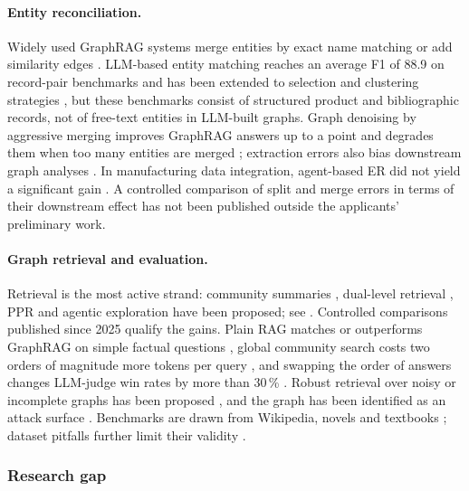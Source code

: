 \paragraph{Entity reconciliation.}
Widely used \ac{GraphRAG} systems merge entities by exact name matching \parencite{edge2024local,guo2025lightrag} or add similarity edges \parencite{gutierrez2024hipporag,gutierrez2025rag}. \ac{LLM}-based entity matching reaches an average F1 of 88.9 on record-pair benchmarks \parencite{peeters2023entity} and has been extended to selection and clustering strategies \parencite{wang2024match,fu2025incontext}, but these benchmarks consist of structured product and bibliographic records, not of free-text entities in \ac{LLM}-built graphs. Graph denoising by aggressive merging improves \ac{GraphRAG} answers up to a point and degrades them when too many entities are merged \parencite{zheng2025less}; extraction errors also bias downstream graph analyses \parencite{cai2025understanding}. In manufacturing data integration, agent-based \ac{ER} did not yield a significant gain \parencite{bega2025mixture}. A controlled comparison of split and merge errors in terms of their downstream effect has not been published outside the applicants' preliminary work.

\paragraph{Graph retrieval and evaluation.}
Retrieval is the most active strand: community summaries \parencite{edge2024local}, dual-level retrieval \parencite{guo2025lightrag}, \ac{PPR} \parencite{gutierrez2024hipporag,gutierrez2025rag} and agentic exploration have been proposed; see \parencite{peng2026survey}. Controlled comparisons published since 2025 qualify the gains. Plain \ac{RAG} matches or outperforms \ac{GraphRAG} on simple factual questions \parencite{xiang2025when}, global community search costs two orders of magnitude more tokens per query \parencite{zhou2025indepth}, and swapping the order of answers changes \ac{LLM}-judge win rates by more than 30\,\% \parencite{zeng2025significant,han2026rag}. Robust retrieval over noisy or incomplete graphs has been proposed \parencite{ma2026dontworry}, and the graph has been identified as an attack surface \parencite{liang2026underfire}. Benchmarks are drawn from Wikipedia, novels and textbooks \parencite{xiang2025when,xiao2025graphragbench}; dataset pitfalls further limit their validity \parencite{zhang2025diagnosing}.

\subsubsection{Research gap}\label{sec:gap}

